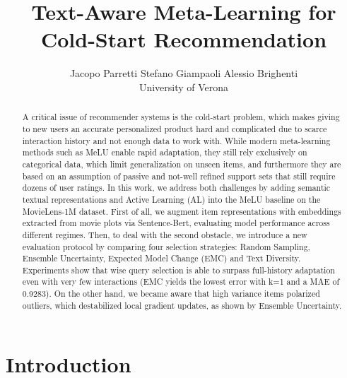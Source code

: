 \documentclass[10pt,twocolumn,letterpaper]{article}
\title{Text-Aware Meta-Learning for Cold-Start Recommendation}
\author{Jacopo Parretti \qquad Stefano Giampaoli \qquad Alessio Brighenti\\
University of Verona\\
}
\begin{document}
\maketitle

\begin{abstract}
A critical issue of recommender systems is the cold-start problem, which makes giving to new users an accurate personalized product hard and complicated due to scarce interaction history and not enough data to work with. While modern meta-learning methods such as MeLU enable rapid adaptation, they still rely exclusively on categorical data, which limit generalization on unseen items, and furthermore they are based on an assumption of passive and not-well refined support sets that still require dozens of user ratings. In this work, we address both challenges by adding semantic textual representations and Active Learning (AL) into the MeLU baseline on the MovieLens-1M dataset. First of all, we augment item representations with embeddings extracted from movie plots via Sentence-Bert, evaluating model performance across different regimes. Then, to deal with the second obstacle, we introduce a new evaluation protocol by comparing four selection strategies: Random Sampling, Ensemble Uncertainty, Expected Model Change (EMC) and Text Diversity. Experiments show that wise query selection is able to surpass full-history adaptation even with very few interactions (EMC yields the lowest error with k=1 and a MAE of 0.9283). On the other hand, we became aware that high variance items polarized outliers, which destabilized local gradient updates, as shown by Ensemble Uncertainty.
\end{abstract}

\section{Introduction}
\label{sec:intro}
\end{document}
